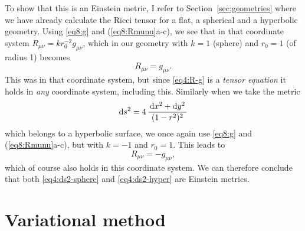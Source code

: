 \documentclass[11pt,a4paper, 
swedish, english %
]{article}
\begin{document}
To show that this is an Einstein metric, I refer to
Section~\ref{sec:geometries} where we have already calculate the Ricci
tensor for a flat, a spherical and a hyperbolic geometry. Using
\eqref{eq8:g} and (\ref{eq8:Rmunu}a-c), we see that in
that coordinate system $R_{\mu\nu}=kr_0^{-2}g_{\mu\nu}$, which in our
geometry with $k=1$ (sphere) and $r_0=1$ (of radius 1) becomes
\begin{equation}\label{eq4:R-g}
R_{\mu\nu}=g_{\mu\nu}.
\end{equation}
This was in that coordinate system, but since \eqref{eq4:R-g} is a
\emph{tensor equation} it holds in \emph{any} coordinate system,
including this. Similarly when we take the metric
\begin{equation}\label{eq4:ds2-hyper}
\mathrm{d}{s}^2=4\,\frac{\,\mathrm{d}{x}^2+\mathrm{d}{y}^2\,}{(1-r^2)^2}
\end{equation}
which belongs to a hyperbolic surface, we once again use \eqref{eq8:g}
and (\ref{eq8:Rmunu}a-c), but with $k=-1$ and $r_0=1$. This leads to
\begin{equation}
R_{\mu\nu}=-g_{\mu\nu},
\end{equation}
which of course also holds in this coordinate system. We can therefore
conclude that both \eqref{eq4:ds2-sphere} and \eqref{eq4:ds2-hyper}
are Einstein metrics.


\section{Variational method}
\end{document}
